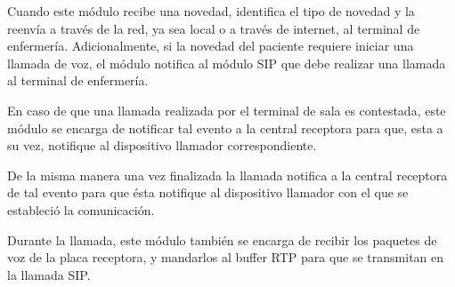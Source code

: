 Cuando este módulo recibe una novedad, identifica el tipo de novedad y la reenvía a través de la red, ya sea local o a través de internet, al terminal de enfermería. Adicionalmente, si la novedad del paciente requiere iniciar una llamada de voz, el módulo notifica al módulo SIP que debe realizar una llamada al terminal de enfermería.

En caso de que una llamada realizada por el terminal de sala es contestada, este módulo se encarga de notificar tal evento a la central receptora para que, esta a su vez, notifique al dispositivo llamador correspondiente.

De la misma manera una vez finalizada la llamada notifica a la central receptora de tal evento para que ésta notifique al dispositivo llamador con el que se estableció la comunicación.

Durante la llamada, este módulo también se encarga de recibir los paquetes de voz de la placa receptora, y mandarlos al buffer RTP para que se transmitan en la llamada SIP.
